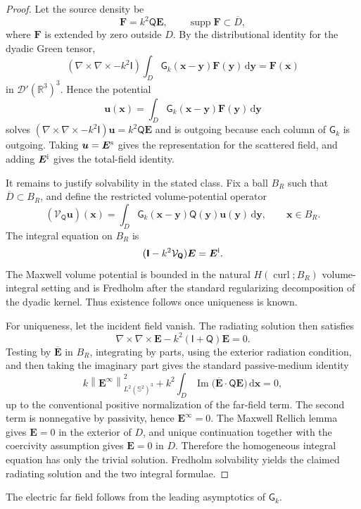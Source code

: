 \documentclass[11pt]{article}
\numberwithin{equation}{section}
\newcommand{\R}{\mathbb{R}}
\newcommand{\Sph}{\mathbb{S}}
\newcommand{\dd}{\,\mathrm d}
\newcommand{\supp}{\operatorname{supp}}
\newcommand{\curl}{\nabla\times}
\newcommand{\vect}[1]{\bm{#1}}
\newcommand{\tens}[1]{\bm{\mathsf{#1}}}
\newcommand{\Id}{\ensuremath{\tens{I}}}
\newcommand{\G}{\ensuremath{\tens{G}}}
\newcommand{\Qt}{\ensuremath{\tens{Q}}}
\newcommand{\norm}[1]{\left\lVert #1\right\rVert}
\theoremstyle{plain}
\theoremstyle{definition}
\begin{document}
\begin{proof}
Let the source density be
\[
  \vect{F}=k^2\Qt\vect{E},
  \qquad \supp \vect{F}\subset \overline D,
\]
where \(\vect{F}\) is extended by zero outside \(D\).  By the distributional identity for the dyadic Green tensor,
\[
  (\curl\curl-k^2\Id)\int_D \G_k(\vect{x}-\vect{y})\vect{F}(\vect{y})\dd\vect{y}
  =\vect{F}(\vect{x})
\]
in \(\mathcal D'(\R^3)^3\).  Hence the potential
\[
  \vect{u}(\vect{x})=\int_D \G_k(\vect{x}-\vect{y})\vect{F}(\vect{y})\dd\vect{y}
\]
solves \((\curl\curl-k^2\Id)\vect{u}=k^2\Qt\vect{E}\) and is outgoing because each column of \(\G_k\) is outgoing.  Taking \(\vect{u}=\vect{E}^{\rm s}\) gives the representation for the scattered field, and adding \(\vect{E}^{\rm i}\) gives the total-field identity.

It remains to justify solvability in the stated class.  Fix a ball \(B_R\) such that \(\overline D\subset B_R\), and define the restricted volume-potential operator
\[
  (\mathcal V_{\Qt}\vect{u})(\vect{x})
  =\int_D\G_k(\vect{x}-\vect{y})\Qt(\vect{y})\vect{u}(\vect{y})\dd\vect{y},
  \qquad \vect{x}\in B_R .
\]
The integral equation on \(B_R\) is
\[
  (\Id-k^2\mathcal V_{\Qt})\vect{E}=\vect{E}^{\rm i}.
\]
The Maxwell volume potential is bounded in the natural \(H(\operatorname{curl};B_R)\) volume-integral setting and is Fredholm after the standard regularizing decomposition of the dyadic kernel.  Thus existence follows once uniqueness is known.

For uniqueness, let the incident field vanish.  The radiating solution then satisfies
\[
  \curl\curl\vect{E}-k^2(\Id+\Qt)\vect{E}=0 .
\]
Testing by \(\overline{\vect{E}}\) in \(B_R\), integrating by parts, using the exterior radiation condition, and then taking the imaginary part gives the standard passive-medium identity
\[
  k\norm{\vect{E}^{\infty}}_{L^2(\Sph^2)^3}^2
  +k^2\int_D \operatorname{Im}\big(\overline{\vect{E}}\cdot \Qt\vect{E}\big)\dd\vect{x}=0,
\]
up to the conventional positive normalization of the far-field term.  The second term is nonnegative by passivity, hence \(\vect{E}^{\infty}=0\).  The Maxwell Rellich lemma gives \(\vect{E}=0\) in the exterior of \(D\), and unique continuation together with the coercivity assumption gives \(\vect{E}=0\) in \(D\).  Therefore the homogeneous integral equation has only the trivial solution.  Fredholm solvability yields the claimed radiating solution and the two integral formulae.
\end{proof}

The electric far field follows from the leading asymptotics of $\G_k$.  
\end{document}
